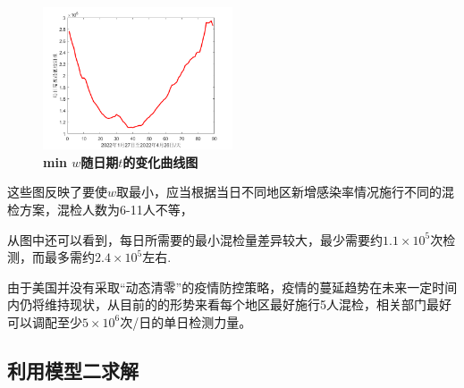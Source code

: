 \documentclass[withoutpreface,bwprint]{cumcmthesis} %
\begin{document}
\begin{figure}[H]
\centering
\includegraphics[width=0.5\textwidth]{fig_pro22.png}
\caption{\textbf{\rm{min} $w$随日期$t$的变化曲线图}}
\label{pro1}
\end{figure}

这些图反映了要使$w$取最小，应当根据当日不同地区新增感染率情况施行不同的混检方案，混检人数为6-11人不等，

从图中还可以看到，每日所需要的最小混检量差异较大，最少需要约$1.1 \times 10^5$次检测，而最多需约$2.4 \times 10^5$左右.

由于美国并没有采取“动态清零”的疫情防控策略，疫情的蔓延趋势在未来一定时间内仍将维持现状，从目前的的形势来看每个地区最好施行5人混检，相关部门最好可以调配至少$5 \times 10^6$次/日的单日检测力量。

\subsection{利用模型二求解}
\end{document}
